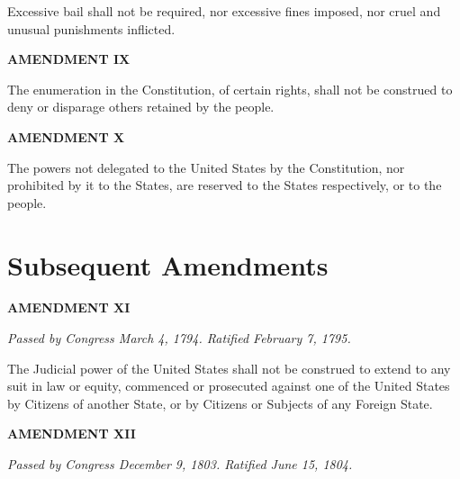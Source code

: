 Excessive bail shall not be required, nor excessive fines imposed, nor cruel and unusual punishments inflicted.

\begin{center} \textbf{AMENDMENT IX} \end{center} 

The enumeration in the Constitution, of certain rights, shall not be construed to deny or disparage others retained by the people.

\begin{center} 
\textbf{AMENDMENT X}
\end{center} 

The powers not delegated to the United States by the Constitution, nor prohibited by it to the States, are reserved to the States respectively, or to the people.


\section{Subsequent Amendments}

\begin{center} 
\textbf{AMENDMENT XI}
\end{center} 

\textit{Passed by Congress March 4, 1794. Ratified February 7, 1795.}

The Judicial power of the United States shall not be construed to extend to any suit in law or equity, commenced or prosecuted against one of the United States by Citizens of another State, or by Citizens or Subjects of any Foreign State.

\begin{center} 
\textbf{AMENDMENT XII}
\end{center} 

\textit{Passed by Congress December 9, 1803. Ratified June 15, 1804.}

